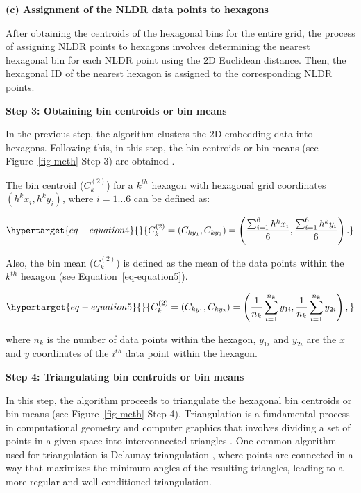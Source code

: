 \documentclass[
  12pt]{article}
\begin{document}
\textbf{(c) Assignment of the NLDR data points to hexagons}

After obtaining the centroids of the hexagonal bins for the entire grid,
the process of assigning NLDR points to hexagons involves determining
the nearest hexagonal bin for each NLDR point using the 2D Euclidean
distance. Then, the hexagonal ID of the nearest hexagon is assigned to
the corresponding NLDR points.

\textbf{Step 3: Obtaining bin centroids or bin means}

In the previous step, the algorithm clusters the 2D embedding data into
hexagons. Following this, in this step, the bin centroids or bin means
(see Figure~\ref{fig-meth} Step 3) are obtained \citep{Carr2013}.

The bin centroid (\(C_k^{(2)}\)) for a \(k^{th}\) hexagon with hexagonal
grid coordinates \((h^{k}x_{i}, h^{k}y_{i})\), where \(i = 1 \dots 6\)
can be defined as:

\begin{equation}\protect\hypertarget{eq-equation4}{}{
C_k^{(2)} = (C_{ky_1}, C_{ky_2}) = \left(\frac{\sum_{i=1}^{6} h^{k}x_{i}}{6}, \frac{\sum_{i=1}^{6} h^{k}y_{i}}{6}\right).
}\label{eq-equation4}\end{equation}

Also, the bin mean (\(C_k^{(2)}\)) is defined as the mean of the data
points within the \(k^{th}\) hexagon (see Equation~\ref{eq-equation5}).

\begin{equation}\protect\hypertarget{eq-equation5}{}{
C_k^{(2)} = (C_{ky_1}, C_{ky_2}) = \left(\frac{1}{n_k} \sum_{i=1}^{n_k} y_{1i}, \frac{1}{n_k} \sum_{i=1}^{n_k} y_{2i}\right),
}\label{eq-equation5}\end{equation}

where \(n_k\) is the number of data points within the hexagon,
\(y_{1i}\) and \(y_{2i}\) are the \(x\) and \(y\) coordinates of the
\(i^{th}\) data point within the hexagon.

\textbf{Step 4: Triangulating bin centroids or bin means}

In this step, the algorithm proceeds to triangulate the hexagonal bin
centroids or bin means (see Figure~\ref{fig-meth} Step 4). Triangulation
is a fundamental process in computational geometry and computer graphics
that involves dividing a set of points in a given space into
interconnected triangles \citep{article30}. One common algorithm used
for triangulation is Delaunay triangulation
\citep[\citet{article54}]{article26}, where points are connected in a
way that maximizes the minimum angles of the resulting triangles,
leading to a more regular and well-conditioned triangulation.
\end{document}
